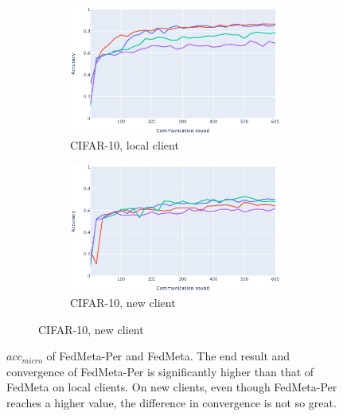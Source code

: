 \documentclass[runningheads]{llncs}
\begin{document}
\begin{figure}[h]
\begin{subfigure}{\textwidth}
\begin{subfigure}{.49\textwidth}
        \end{subfigure}
    \end{subfigure}
    \begin{subfigure}{\textwidth}
        \centering
        \begin{subfigure}{.49\textwidth}
            \includegraphics[width=\linewidth]{img/cifar_old_metaper.eps}
            \caption{CIFAR-10, local client}\label{cifar_old_metaper}
        \end{subfigure}
        \begin{subfigure}{.49\textwidth}
            \includegraphics[width=\linewidth]{img/cifar_new_metaper.eps}
            \caption{CIFAR-10, new client}\label{cifar_new_metaper}
        \end{subfigure}
    \end{subfigure}
    \caption{$acc_{micro}$ of FedMeta-Per and FedMeta. The end result and convergence of FedMeta-Per is significantly higher than that of FedMeta on local clients. On new clients, even though FedMeta-Per reaches a higher value, the difference in convergence is not so great.} \label{fig:fedpermeta_vs_fedmeta}
\end{figure}
\end{document}
